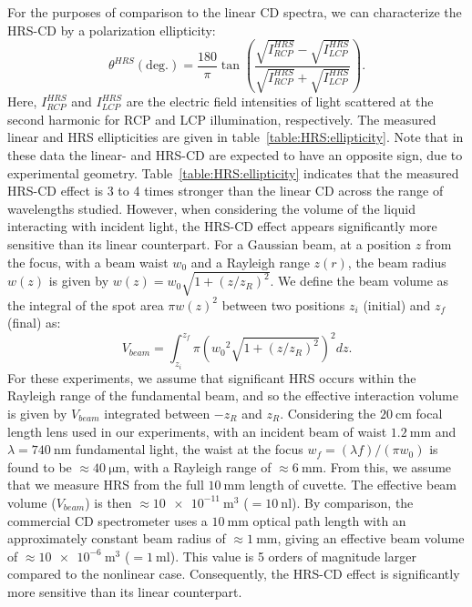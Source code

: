 For the purposes of comparison to the linear CD spectra, we can characterize the HRS-CD by a polarization ellipticity:
\begin{equation}
    \theta^{HRS} (\text{deg.}) = \frac{180}{\pi} \tan\left( \frac{\sqrt{I_{RCP}^{HRS}} - \sqrt{I_{LCP}^{HRS}}}{\sqrt{I_{RCP}^{HRS}} + \sqrt{I_{LCP}^{HRS}}} \right).
\end{equation}
Here, $I_{RCP}^{HRS}$ and $I_{LCP}^{HRS}$ are the electric field intensities of light scattered at the second harmonic for RCP and LCP illumination, respectively. 
The measured linear and HRS ellipticities are given in table~\ref{table:HRS:ellipticity}. Note that in these data the linear- and HRS-CD are expected to have an opposite sign, due to experimental geometry.
Table~\ref{table:HRS:ellipticity} indicates that the measured HRS-CD effect is 3 to 4 times stronger than the linear CD across the range of wavelengths studied. However, when considering the volume of the liquid interacting with incident light, the HRS-CD effect appears significantly more sensitive than its linear counterpart. 
For a Gaussian beam, at a position $z$ from the focus, with a beam waist $w_0$ and a Rayleigh range $z(r)$, the beam radius $w(z)$ is given by $w(z) = {w_0}\sqrt {1 + (z/z_R)^2}$. 
We define the beam volume as the integral of the spot area $\pi w(z)^2$ between two positions $z_i$ (initial) and $z_f$ (final) as:
\begin{equation}
    V_{beam} = \int^{z_f}_{z_i} \pi \left( {w_0}^2 \sqrt {1 + (z/z_R)^2} \right)^2 dz.
\end{equation} 
For these experiments, we assume that significant HRS occurs within the Rayleigh range of the fundamental beam, and so the effective interaction volume is given by $V_{beam}$ integrated between $-z_R$ and $z_R$. 
Considering the $\SI{20}{\centi\m}$ focal length lens used in our experiments, with an incident beam of waist $\SI{1.2}{\milli\m}$ and $\lambda = \SI{740}{\nano\m}$ fundamental light, the waist at the focus ${w_f} = (\lambda f)/(\pi {w_0})$ is found to be $\approx \SI{40}{\micro\m}$, with a Rayleigh range of $\approx \SI{6}{\milli\m}$. From this, we assume that we measure HRS from the full $\SI{10}{\milli\m}$ length of cuvette. 
The effective beam volume ($V_{beam}$) is then $\approx \SI{10e-11}{\m\cubed}$ ($=\SI{10}{\nano\litre}$). 
By comparison, the commercial CD spectrometer uses a $\SI{10}{\milli\m}$ optical path length with an approximately constant beam radius of $\approx \SI{1}{\milli\m}$, giving an effective beam volume of  $\approx \SI{10e-6}{\m\cubed}$ ($=\SI{1}{\milli\litre}$). 
This value is 5 orders of magnitude larger compared to the nonlinear case. Consequently, the HRS-CD effect is significantly more sensitive than its linear counterpart. 

